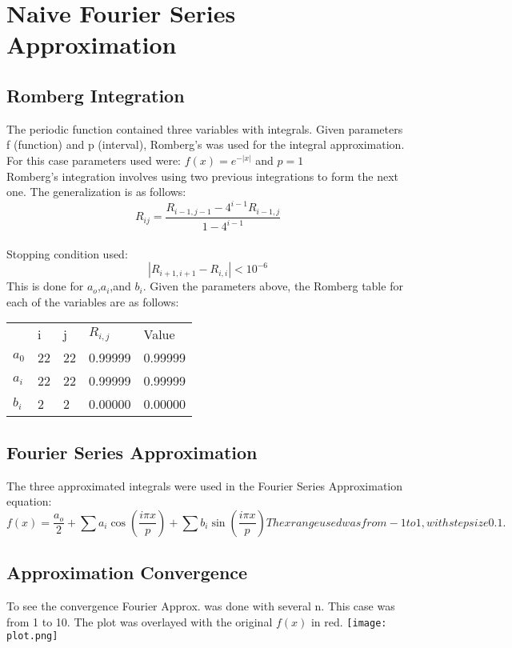\documentclass[10pt, twocolumn]{article}
\begin{document}
	\section{Naive Fourier Series Approximation}
    	\subsection{Romberg Integration}
        The periodic function contained three variables with integrals. Given parameters f (function) and p (interval), Romberg's was used for the integral approximation.
        For this case parameters used were:
        $f(x) = e^{-\left | x \right |}$ and
        $p=1$
        \\
        Romberg's integration involves using two previous integrations to form the next one. The generalization is as follows:
        $$R_{ij}=\frac{R_{i-1,j-1} - 4^{i-1}R_{i-1,j}}{1-4^{i-1}}$$
        \\
        Stopping condition used: $$\left | R_{i+1,i+1}-R_{i,i} \right | < 10^{-6}$$
        This is done for $a_{o}$,$a_{i}$,and $b_{i}$. Given the parameters above, the Romberg table for each of the variables are as follows:
        \begin{table}[h]
          \begin{tabular}{lllll}
             & i  & j  & $R_{i,j}$  & Value   \\
          $a_{0}$ & 22 & 22 & 0.99999 & 0.99999 \\
          $a_{i}$ & 22 & 22 & 0.99999 & 0.99999 \\
          $b_{i}$ & 2  & 2  & 0.00000 & 0.00000     
          \end{tabular}
        \end{table}
        
        \subsection{Fourier Series Approximation}
        The three approximated integrals were used in the Fourier Series Approximation equation:
        $$
        f(x)=\frac{a_{o}}{2}+\sum a_{i}\cos \left ( \frac{i\pi x}{p} \right )+\sum b_{i}\sin \left ( \frac{i\pi x}{p} \right )
        The x range used was from -1 to 1, with step size 0.1.
        $$
        \subsection{Approximation Convergence}
        To see the convergence Fourier Approx. was done with several n. This case was from 1 to 10. The plot was overlayed with the original $f(x)$ in red.
        \texttt{[image: plot.png]}
\end{document}

